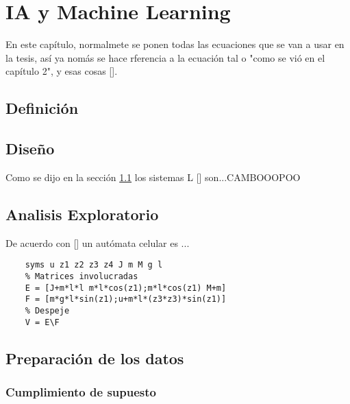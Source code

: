 

\chapter{IA y Machine Learning}
En este capítulo, normalmete se ponen todas las ecuaciones que se van a usar en la tesis, así ya nomás se hace rferencia a la ecuación tal o "como se vió en el capítulo 2", y esas cosas [\citep{Pau86}].

\section{Definición}
\label{sec:SistemasL}
\blindtext
\section{Diseño}
Como se dijo en la sección \ref{sec:SistemasL} los sistemas L [\cite{Peitgen2004}] son...CAMBOOOPOO
\blindtext

\section{Analisis Exploratorio}
De acuerdo con [\citep{KaplanGlass1995}] un autómata celular es ...

\begin{lstlisting}[frame=single]
    % Declaracion de las variables simbolicas
    syms u z1 z2 z3 z4 J m M g l 
    % Matrices involucradas
    E = [J+m*l*l m*l*cos(z1);m*l*cos(z1) M+m] 
    F = [m*g*l*sin(z1);u+m*l*(z3*z3)*sin(z1)] 
    % Despeje
    V = E\F
\end{lstlisting}

\section{Preparación de los datos}

\blindtext

\subsection{Cumplimiento de supuesto}

